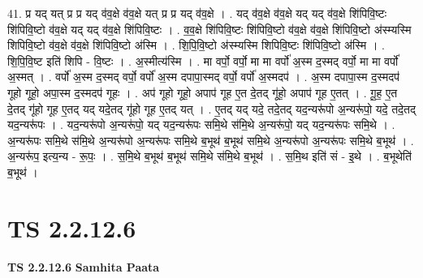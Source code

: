 \documentclass[17pt]{extarticle}
\begin{document}
41. प्र यद् यत् प्र प्र यद् व॑व॒क्षे व॑व॒क्षे यत् प्र प्र यद् व॑व॒क्षे । . यद् व॑व॒क्षे व॑व॒क्षे यद् यद् व॑व॒क्षे शि॑पिवि॒ष्टः शि॑पिवि॒ष्टो व॑व॒क्षे यद् यद् व॑व॒क्षे शि॑पिवि॒ष्टः । . व॒व॒क्षे शि॑पिवि॒ष्टः शि॑पिवि॒ष्टो व॑व॒क्षे व॑व॒क्षे शि॑पिवि॒ष्टो अ॑स्म्यस्मि शिपिवि॒ष्टो व॑व॒क्षे व॑व॒क्षे शि॑पिवि॒ष्टो अ॑स्मि । . शि॒पि॒वि॒ष्टो अ॑स्म्यस्मि शिपिवि॒ष्टः शि॑पिवि॒ष्टो अ॑स्मि । . शि॒पि॒वि॒ष्ट इति॑ शिपि - वि॒ष्टः । . अ॒स्मीत्य॑स्मि । . मा वर्पो॒ वर्पो॒ मा मा वर्पो॑ अ॒स्म द॒स्मद् वर्पो॒ मा मा वर्पो॑ अ॒स्मत् । . वर्पो॑ अ॒स्म द॒स्मद् वर्पो॒ वर्पो॑ अ॒स्म दपापा॒स्मद् वर्पो॒ वर्पो॑ अ॒स्मदप॑ । . अ॒स्म दपापा॒स्म द॒स्मदप॑ गूहो गूहो॒ अपा॒स्म द॒स्मदप॑ गूहः । . अप॑ गूहो गूहो॒ अपाप॑ गूह ए॒त दे॒तद् गू॑हो॒ अपाप॑ गूह ए॒तत् । . गू॒ह॒ ए॒त दे॒तद् गू॑हो गूह ए॒तद् यद् यदे॒तद् गू॑हो गूह ए॒तद् यत् । . ए॒तद् यद् यदे॒ तदे॒तद् यद॒न्यरू॑पो अ॒न्यरू॑पो॒ यदे॒ तदे॒तद् यद॒न्यरू॑पः । . यद॒न्यरू॑पो अ॒न्यरू॑पो॒ यद् यद॒न्यरू॑पः समि॒थे स॑मि॒थे अ॒न्यरू॑पो॒ यद् यद॒न्यरू॑पः समि॒थे । . अ॒न्यरू॑पः समि॒थे स॑मि॒थे अ॒न्यरू॑पो अ॒न्यरू॑पः समि॒थे ब॒भूथ॑ ब॒भूथ॑ समि॒थे अ॒न्यरू॑पो अ॒न्यरू॑पः समि॒थे ब॒भूथ॑ । . अ॒न्यरू॑प॒ इत्य॒न्य - रू॒पः॒ । . स॒मि॒थे ब॒भूथ॑ ब॒भूथ॑ समि॒थे स॑मि॒थे ब॒भूथ॑ । . स॒मि॒थ इति॑ सं - इ॒थे । . ब॒भूथेति॑ ब॒भूथ॑ । \newline
\pagebreak
{}
\section*{ TS 2.2.12.6 }

\textbf{TS 2.2.12.6 } \newline
\textbf{Samhita Paata} \newline
\end{document}
